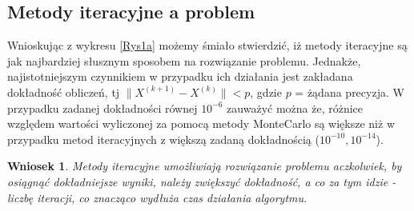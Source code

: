 \documentclass[10pt]{article}
\newtheorem{wn}{Wniosek}
\begin{document}
\subsection{Metody iteracyjne a problem}
Wnioskując z wykresu \ref{Rys1a} możemy śmiało stwierdzić, iż metody iteracyjne są jak najbardziej słusznym sposobem na rozwiązanie problemu. Jednakże, najistotniejszym czynnikiem w przypadku ich działania jest zakładana dokładność obliczeń, tj $\|{X^{(k+1)}-X^{(k)}}\| < p$, gdzie $p$ = żądana precyzja.
W przypadku zadanej dokładności równej $10^{-6}$ zauważyć można że, różnice względem wartości wyliczonej za pomocą metody MonteCarlo są większe niż w przypadku metod iteracyjnych z większą zadaną dokładnością ($10^{-10}, 10^{-14}$).
\begin{wn}
	Metody iteracyjne umożliwiają rozwiązanie problemu aczkolwiek, by osiągnąć dokładniejsze wyniki, należy zwiększyć dokładność, a co za tym idzie - liczbę iteracji, co znacząco wydłuża czas działania algorytmu.
\end{wn}
\end{document}
